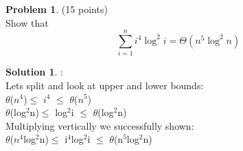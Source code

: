 \documentclass{article}
\theoremstyle{definition}
\newtheorem{problem}{Problem}
\newtheorem*{solution}{Solution}
\begin{document}
\newpage

\begin{problem} (15 points)\\
Show that $$\sum_{i=1}^n i^4 \log^2 i = \Theta(n^5 \log^2 n)$$
\end{problem}
\begin{solution} :
\\
Lets split and look at upper and lower bounds:
\\

$\theta$($n^4$)$\leq$ $i^4$ $\leq$ $\theta$($n^5$)
\\

$\theta$(log$^2$n)$\leq$ log$^2$i $\leq$ $\theta$(log$^2$n)
\\
Multiplying vertically we successfully shown:
\\

$\theta$($n^4$log$^2$n)$\leq$ i$^4$log$^2$i $\leq$ $\theta$(n$^5$log$^2$n)
\end{solution}

\newpage
\end{document}
